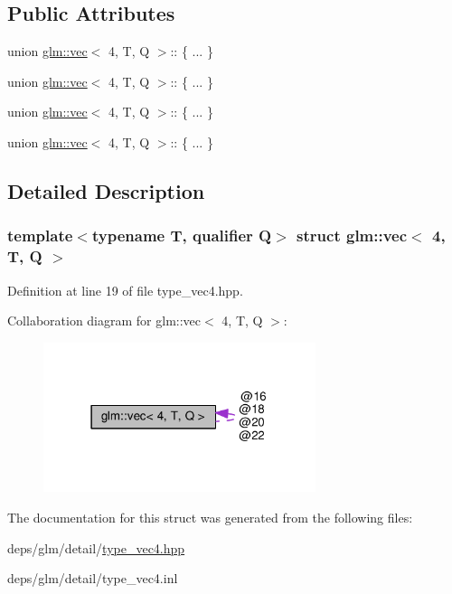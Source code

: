 \subsection*{Public Attributes}
\begin{DoxyCompactItemize}
\item 
\mbox{\label{structglm_1_1vec_3_014_00_01T_00_01Q_01_4_a04f7852772574799d1312c003439782b}} 
union \hyperlink{structglm_1_1vec}{glm\+::vec}$<$ 4, T, Q $>$\+:: \{ ... \}  
\item 
\mbox{\label{structglm_1_1vec_3_014_00_01T_00_01Q_01_4_a5df9d67d58363c1dd9f11713c88ed163}} 
union \hyperlink{structglm_1_1vec}{glm\+::vec}$<$ 4, T, Q $>$\+:: \{ ... \}  
\item 
\mbox{\label{structglm_1_1vec_3_014_00_01T_00_01Q_01_4_a09d123322852056e41e8c334fb9281d6}} 
union \hyperlink{structglm_1_1vec}{glm\+::vec}$<$ 4, T, Q $>$\+:: \{ ... \}  
\item 
\mbox{\label{structglm_1_1vec_3_014_00_01T_00_01Q_01_4_a25038cf5893fca50033059cad68b3b50}} 
union \hyperlink{structglm_1_1vec}{glm\+::vec}$<$ 4, T, Q $>$\+:: \{ ... \}  
\end{DoxyCompactItemize}


\subsection{Detailed Description}
\subsubsection*{template$<$typename T, qualifier Q$>$\newline
struct glm\+::vec$<$ 4, T, Q $>$}



Definition at line 19 of file type\+\_\+vec4.\+hpp.



Collaboration diagram for glm\+:\+:vec$<$ 4, T, Q $>$\+:
\nopagebreak
\begin{figure}[H]
\begin{center}
\leavevmode
\includegraphics[width=226pt]{d3/d8b/structglm_1_1vec_3_014_00_01T_00_01Q_01_4__coll__graph}
\end{center}
\end{figure}


The documentation for this struct was generated from the following files\+:\begin{DoxyCompactItemize}
\item 
deps/glm/detail/\hyperlink{type__vec4_8hpp}{type\+\_\+vec4.\+hpp}\item 
deps/glm/detail/type\+\_\+vec4.\+inl\end{DoxyCompactItemize}
